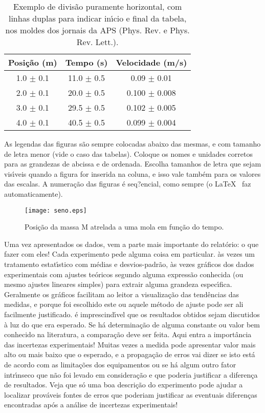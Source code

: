 \documentclass[twocolumn]{article}
\newcommand{\2}{\hspace{5mm}}
\newcommand{\5}{\vspace{5mm}}
\newcommand{\7}{\vspace{7mm}}
\begin{document}
\begin{table}
\caption{\small Exemplo de divis\~ao puramente horizontal, com linhas 
duplas para indicar in\'{\i}cio e final da tabela, nos moldes dos 
jornais da APS (Phys. Rev. e Phys. Rev. Lett.).}
\begin{center}
\begin{tabular}{ccc} \hline \hline
Posi\c{c}\~ao (m) & Tempo (s) & Velocidade (m/s) \\ \hline
1.0 $\pm$ 0.1 & 11.0 $\pm$ 0.5 & 0.09 $\pm$ 0.01 \\ 
2.0 $\pm$ 0.1 & 20.0 $\pm$ 0.5 & 0.100 $\pm$ 0.008 \\ 
3.0 $\pm$ 0.1 & 29.5 $\pm$ 0.5 & 0.102 $\pm$ 0.005 \\ 
4.0 $\pm$ 0.1 & 40.5 $\pm$ 0.5 & 0.099 $\pm$ 0.004 \\ \hline \hline
\end{tabular}
\end{center}
\label{t2}
\end{table}

\2 As legendas das figuras s\~ao sempre colocadas abaixo das mesmas, e 
com tamanho de letra menor (vide o caso das tabelas). Coloque os nomes 
e unidades corretos para as grandezas de abcissa e de ordenada. Escolha 
tamanhos de letra que sejam vis\'{\i}veis quando a figura for inserida 
na coluna, e isso vale tamb\'em para os valores das escalas. A 
numera\c{c}\~ao das figuras \'e seq?encial, como sempre (o \LaTeX ~ faz 
automaticamente). 

\begin{figure}
\texttt{[image: seno.eps]}
\caption{Posi\c{c}\~ao da massa M atrelada a uma mola em fun\c{c}\~ao do 
tempo.}
\end{figure}

\2 Uma vez apresentados os dados, vem a parte mais importante do 
relat\'orio: o que fazer com eles! Cada experimento pede alguma coisa 
em particular. \`as vezes um tratamento estat\'{\i}stico com m\'edias e 
desvios-padr\~ao, \`as vezes gr\'aficos dos dados experimentais com 
ajustes te\'oricos segundo alguma express\~ao conhecida (ou mesmo 
ajustes lineares simples) para extrair alguma grandeza espec\'{\i}fica. 
Geralmente os gr\'aficos facilitam ao leitor a visualiza\c{c}\~ao das 
tend\^encias das medidas, e porque foi escolhido este ou aquele m\'etodo 
de ajuste pode ser ali facilmente justificado. \'e imprescind\'{\i}vel 
que os resultados obtidos sejam discutidos \`a luz do que era esperado. 
Se h\'a determina\c{c}\~ao de alguma constante ou valor bem conhecido na 
literatura, a compara\c{c}\~ao deve ser feita. Aqui entra a import\^ancia 
das incertezas experimentais! Muitas vezes a medida pode apresentar valor 
mais alto ou mais baixo que o esperado, e a propaga\c{c}\~ao de erros vai 
dizer se isto est\'a de acordo com as limita\c{c}\~oes dos equipamentos 
ou se h\'a algum outro fator intr\'{\i}nseco que n\~ao foi levado em 
considera\c{c}\~ao e que poderia justificar a diferen\c{c}a de resultados. 
Veja que s\'o uma boa descri\c{c}\~ao do experimento pode ajudar a 
localizar prov\'aveis fontes de erros que poderiam justificar as eventuais 
diferen\c{c}as encontradas ap\'os a an\'alise de incertezas experimentais!
\end{document}

